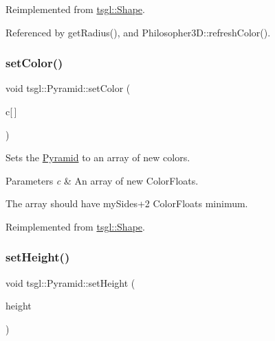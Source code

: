 Reimplemented from \hyperlink{classtsgl_1_1_shape_abdb01321cddfd2db1481eefbc2836f70}{tsgl\+::\+Shape}.



Referenced by get\+Radius(), and Philosopher3\+D\+::refresh\+Color().

\mbox{\label{classtsgl_1_1_pyramid_a83799687df3bdef698f9687da7a6c100}} 
\subsubsection{\texorpdfstring{set\+Color()}{setColor()}\hspace{0.1cm}{\footnotesize\ttfamily [2/2]}}
{\footnotesize\ttfamily void tsgl\+::\+Pyramid\+::set\+Color (\begin{DoxyParamCaption}\item[{\hyperlink{structtsgl_1_1_color_float}{Color\+Float}}]{c\mbox{[}$\,$\mbox{]} }\end{DoxyParamCaption})\hspace{0.3cm}{\ttfamily [virtual]}}



Sets the \hyperlink{classtsgl_1_1_pyramid}{Pyramid} to an array of new colors. 


\begin{DoxyParams}{Parameters}
{\em c} & An array of new Color\+Floats.\\
\hline
\end{DoxyParams}
The array should have my\+Sides+2 Color\+Floats minimum. 

Reimplemented from \hyperlink{classtsgl_1_1_shape_ad7e554b5d4cea111ec518548b9f21388}{tsgl\+::\+Shape}.

\mbox{\label{classtsgl_1_1_pyramid_acb4db4a56452bb0e45dcd120ef517747}} 
\subsubsection{\texorpdfstring{set\+Height()}{setHeight()}}
{\footnotesize\ttfamily void tsgl\+::\+Pyramid\+::set\+Height (\begin{DoxyParamCaption}\item[{float}]{height }\end{DoxyParamCaption})\hspace{0.3cm}{\ttfamily [virtual]}}



